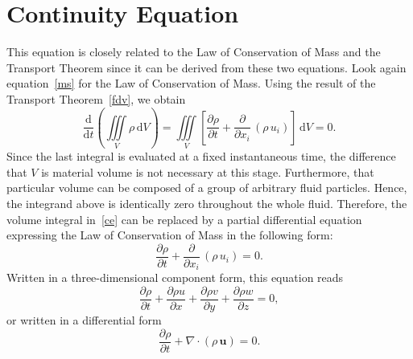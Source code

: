 \documentclass[12pt,a4paper]{report}
\begin{document}
\section{Continuity Equation}     \label{kontinuitas}

This equation is closely related to the Law of Conservation of Mass and the Transport Theorem since it can be derived from these two equations.
Look again equation~\eqref{ms} for the Law of Conservation of Mass. Using the result of the Transport Theorem~\eqref{fdv}, we obtain
\begin{equation}
\frac{\mathrm{d}}{\mathrm{d}t} \left(\iiint\limits_{V} \rho \, \mathrm{d}V \right) = \iiint\limits_{V} \left[\frac{\partial \rho}{\partial t} + 
\frac{\partial}{\partial x_{i}} \, \left(\rho \, u_{i} \right) \right] \, \mathrm{d}V = 0.
\label{ce}
\end{equation}
Since the last integral is evaluated at a fixed instantaneous time, the difference that $V$ is material volume is not necessary at this stage.
Furthermore, that particular volume can be composed of a group of arbitrary fluid particles.
Hence, the integrand above is identically zero throughout the whole fluid.
Therefore, the volume integral in~\eqref{ce} can be replaced by a partial differential equation expressing the Law of Conservation of Mass in the following form:
\begin{equation}
\frac{\partial \rho}{\partial t} + \frac{\partial}{\partial x_{i}} \, (\rho \, u_{i}) = 0.
\end{equation}
Written in a three-dimensional component form, this equation reads
\begin{equation}
\frac{\partial \rho}{\partial t} + \frac{\partial \rho u}{\partial x} + \frac{\partial \rho v}{\partial y} + \frac{\partial \rho w }{\partial z} = 0, 	\label{ko}
\end{equation}
or written in a differential form
\begin{equation}
\frac{\partial\rho}{\partial t} + \nabla \cdot (\rho \, \mathbf{u}) = 0.
\end{equation}
\end{document}

